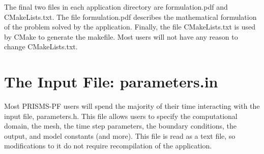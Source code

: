 \documentclass[10pt]{article} %
\begin{document}
The final two files in each application directory are formulation.pdf and CMakeLists.txt. The file formulation.pdf describes the mathematical formulation of the problem solved by the application. Finally, the file CMakeLists.txt is used by CMake to generate the makefile. Most users will not have any reason to change CMakeLists.txt.

\section{The Input File: parameters.in} \label{parameters}
Most PRISMS-PF users will spend the majority of their time interacting with the input file, parameters.h. This file allows users to specify the computational domain, the mesh, the time step parameters, the boundary conditions, the output, and model constants (and more). This file is read as a text file, so modifications to it do not require recompilation of the application.
\end{document}
